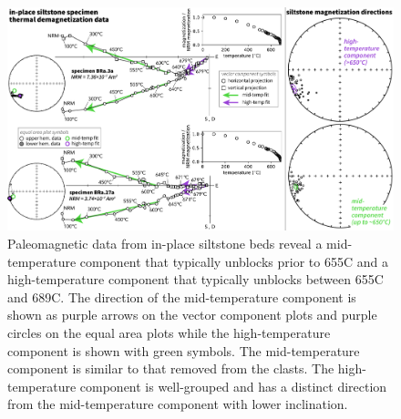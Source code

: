 \documentclass[draft]{agujournal2019}
\begin{document}
\begin{figure}[!ht]
\noindent\includegraphics[width=\textwidth]{Fig3_BRa_pmag.pdf}
\caption{\small{Paleomagnetic data from in-place siltstone beds reveal a mid-temperature component that typically unblocks prior to 655\textdegree C and a high-temperature component that typically unblocks between 655\textdegree C and 689\textdegree C. The direction of the mid-temperature component is shown as purple arrows on the vector component plots and purple circles on the equal area plots while the high-temperature component is shown with green symbols. The mid-temperature component is similar to that removed from the clasts. The high-temperature component is well-grouped and has a distinct direction from the mid-temperature component with lower inclination.}}
\label{fig:insitu_pmag}
\end{figure}
\end{document}
